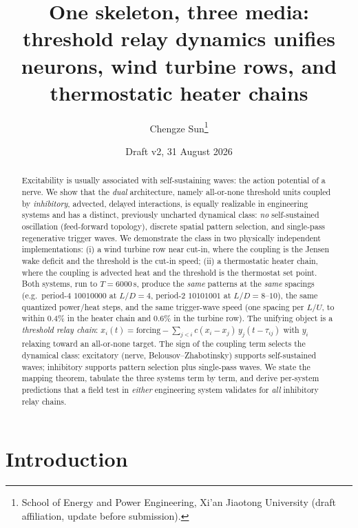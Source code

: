 \documentclass[11pt]{article}
\title{One skeleton, three media: threshold relay dynamics unifies
neurons, wind turbine rows, and thermostatic heater chains}
\author{Chengze Sun\thanks{School of Energy and Power Engineering, Xi'an Jiaotong University (draft affiliation, update before submission).}}
\date{Draft v2, 31 August 2026}
\begin{document}
\maketitle

\begin{abstract}
Excitability is usually associated with self-sustaining waves: the action potential of a
nerve. We show that the \emph{dual} architecture, namely all-or-none threshold units coupled by \emph{inhibitory}, advected, delayed interactions, is equally realizable in engineering systems and has a distinct, previously uncharted dynamical class: \emph{no} self-sustained
oscillation (feed-forward topology), discrete spatial pattern selection, and single-pass
regenerative trigger waves. We demonstrate the class in two physically independent
implementations: (i) a wind turbine row near cut-in, where the coupling is the Jensen wake
deficit and the threshold is the cut-in speed; (ii) a thermostatic heater chain, where the
coupling is advected heat and the threshold is the thermostat set point. Both systems, run to
$T=6000$\,s, produce the \emph{same} patterns at the \emph{same} spacings (e.g.\ period-4
$10010000$ at $L/D=4$, period-2 $10101001$ at $L/D=8$--$10$), the same quantized
power/heat steps, and the same trigger-wave speed (one spacing per $L/U$, to within 0.4\% in
the heater chain and 0.6\% in the turbine row). The unifying object is a \emph{threshold
relay chain}: $x_i(t) = \textstyle\text{forcing} - \sum_{j<i} c(x_i-x_j)\,y_j(t-\tau_{ij})$
with $y_i$ relaxing toward an all-or-none target. The sign of the coupling term selects the
dynamical class: excitatory (nerve, Belousov--Zhabotinsky) supports self-sustained waves;
inhibitory supports pattern selection plus single-pass waves. We state the mapping theorem,
tabulate the three systems term by term, and derive per-system predictions that a field
test in \emph{either} engineering system validates for \emph{all} inhibitory relay chains.
\end{abstract}

\section{Introduction}
\end{document}

